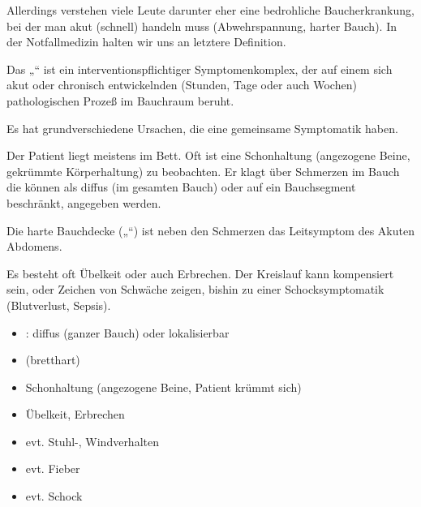 

Allerdings ver\-stehen viele Leute darunter eher
eine bedrohliche Bauch\-erkrankung, bei der man akut (schnell) handeln muss (Ab\-wehrspannung, harter Bauch). In der
Notfallmedizin halten wir uns an letztere Definition. 


\gMarried
{Das „“ ist ein interventionspflichtiger
Symptomenkomplex, der auf einem sich akut oder chronisch
entwickelnden (Stunden, Tage oder auch Wochen) pathologischen
Prozeß im Bauchraum beruht.

Es hat grundverschiedene Ursachen, die eine gemeinsame
Symptomatik haben.

Der Patient liegt meistens im Bett. Oft ist
eine Schonhaltung (angezogene Beine, gekrümmte
Körperhaltung) zu beobachten. Er klagt über Schmerzen im
Bauch die können als diffus (im gesamten Bauch) oder auf ein Bauchsegment
beschränkt, angegeben werden. 

Die harte Bauchdecke („“) ist neben den
Schmerzen das Leitsymptom des Akuten Abdomens. 

Es besteht oft Übelkeit oder auch Erbrechen. Der Kreislauf
kann kompensiert sein, oder Zeichen von Schwäche zeigen,
bishin zu einer Schocksymptomatik (Blutverlust, Sepsis).} 
{

\begin{itemize}
    \item {}: diffus (ganzer Bauch) oder
    lokalisierbar
    \item {} (bretthart)
    \item Schonhaltung  (angezogene Beine, Patient
    krümmt sich)
    \item Übelkeit, Erbrechen
    \item evt. Stuhl-, Windverhalten
    \item evt. Fieber
    \item evt. Schock
\end{itemize}
}


